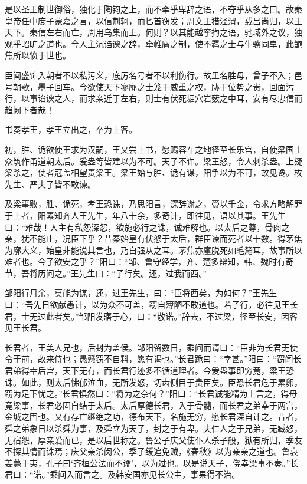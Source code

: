 \documentclass[12pt,UTF8]{ctexbook}
\begin{document}
是以圣王制世御俗，独化于陶钧之上，而不牵乎卑辞之语，不夺乎从多之口。故秦皇帝任中庶子蒙嘉之言，以信荆轲，而匕首窃发；周文王猎泾渭，载吕尚归，以王天下。秦信左右而亡，周用乌集而王。何则？以其能越挛拘之语，驰域外之议，独观乎昭旷之道也。今人主沉诌谀之辞，牵帷廧之制，使不羁之士与牛骥同皁，此鲍焦所以愤于世也。



臣闻盛饰入朝者不以私污义，底厉名号者不以利伤行。故里名胜母，曾子不入；邑号朝歌，墨子回车。今欲使天下寥廓之士笼于威重之权，胁于位势之贵，回面污行，以事谄谀之人，而求亲近于左右，则士有伏死堀穴岩薮之中耳，安有尽忠信而趋阙下者哉！



书奏孝王，孝王立出之，卒为上客。



初，胜、诡欲使王求为汉嗣，王又尝上书，愿赐容车之地径至长乐宫，自使梁国士众筑作甬道朝太后。爰盎等皆建以为不可。天子不许。梁王怒，令人刺杀盎。上疑梁杀之，使者冠盖相望责梁王。梁王始与胜、诡有谋，阳争以为不可，故见谗。枚先生、严夫子皆不敢谏。



及梁事败，胜、诡死，孝王恐诛，乃思阳言，深辞谢之，赍以千金，令求方略解罪于上者，阳素知齐人王先生，年八十余，多奇计，即往见，语以其事。王先生曰：“难哉！人主有私怨深怨，欲施必行之诛，诚难解也。以太后之尊，骨肉之亲，犹不能止，况臣下乎？昔秦始皇有伏怒于太后，群臣谏而死者以十数。得茅焦为廓大义，始皇非能说其言也，乃自强从之耳。茅焦亦廑脱死如毛氂耳，故事所以难者也。今子欲安之乎？”阳曰：“邹、鲁守经学，齐、楚多辩知，韩、魏时有奇节，吾将历问之。”王先生曰：“子行矣。还，过我而西。”



邹阳行月余，莫能为谋，还，过王先生，曰：“臣将西矣，为如何？”王先生曰：“吾先日欲献愚计，以为众不可盖，窃自薄陋不敢道也。若子行，必往见王长君，士无过此者矣。”邹阳发寤于心，曰：“敬诺。”辞去，不过梁，径至长安，因客见王长君。



长君者，王美人兄也，后封为盖侯。邹阳留数日，乘间而请曰：“臣非为长君无使令于前，故来侍也；愚戆窃不自料，愿有谒也。”长君跪曰：“幸甚。”阳曰：“窃闻长君弟得幸后宫，天下无有，而长君行迹多不循道理者。今爰盎事即穷竟，梁王恐诛。如此，则太后怫郁泣血，无所发怒，切齿侧目于贵臣矣。臣恐长君危于累卵，窃为足下忧之。”长君惧然曰：“将为之奈何？”阳曰：“长君诚能精为上言之，得毋竟梁事，长君必固自结于太后。太后厚德长君，入于骨髓，而长君之弟幸于两宫，金城之固也。又有存亡继绝之功，德布天下，名施无穷，愿长君深自计之。昔者，舜之弟象日以杀舜为事，及舜立为天子，封之于有卑。夫仁人之于兄弟，无臧怒，无宿怨，厚亲爱而已，是以后世称之。鲁公子庆父使仆人杀子般，狱有所归，季友不探其情而诛焉；庆父亲杀闵公，季子缓追免贼，《春秋》以为亲亲之道也。鲁哀姜薨于夷，孔子曰‘齐桓公法而不谲’，以为过也。以是说天子，侥幸梁事不奏。”长君曰：“诺。”乘间入而言之。及韩安国亦见长公主，事果得不治。
\end{document}
